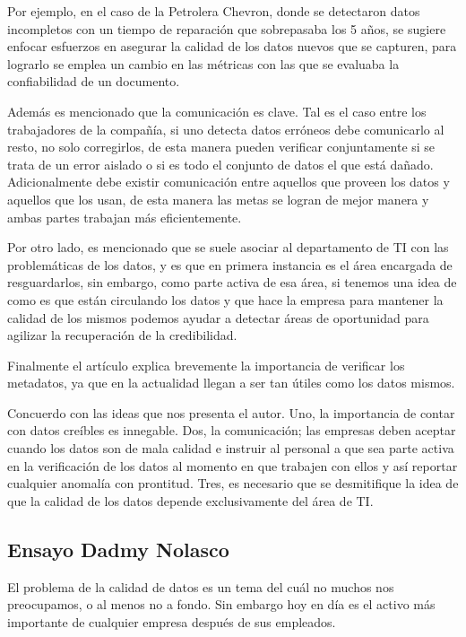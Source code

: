 \documentclass{exam}
\begin{document}
Por ejemplo, en el caso de la Petrolera Chevron, donde se detectaron datos incompletos con un tiempo de reparación que sobrepasaba los 5 años, se sugiere enfocar esfuerzos en asegurar la calidad de los datos nuevos que se capturen, para lograrlo se emplea un cambio en las métricas con las que se evaluaba la confiabilidad de un documento. 

Además es mencionado que la comunicación es clave. Tal es el caso entre los trabajadores de la compañía, si uno detecta datos erróneos debe comunicarlo al resto, no solo corregirlos, de esta manera pueden verificar conjuntamente si se trata de un error aislado o si es todo el conjunto de datos el que está dañado. Adicionalmente debe existir comunicación entre aquellos que proveen los datos y aquellos que los usan, de esta manera las metas se logran de mejor manera y ambas partes trabajan más eficientemente.

Por otro lado, es mencionado que se suele asociar al departamento de TI con las problemáticas de los datos, y es que en primera instancia es el área encargada de resguardarlos, sin embargo, como parte activa de esa área, si tenemos una idea de como es que están circulando los datos y que hace la empresa para mantener la calidad de los mismos podemos ayudar a detectar áreas de oportunidad para agilizar la recuperación de la credibilidad.

Finalmente el artículo explica brevemente la importancia de verificar los metadatos, ya que en la actualidad llegan a ser tan útiles como los datos mismos.

Concuerdo con las ideas que nos presenta el autor. Uno, la importancia de contar con datos creíbles es innegable. Dos, la comunicación; las empresas deben aceptar cuando los datos son de mala calidad e instruir al personal a que sea parte activa en la verificación de los datos al momento en que trabajen con ellos y así reportar cualquier anomalía con prontitud. Tres, es necesario que se desmitifique la idea de que la calidad de los datos depende exclusivamente del área de TI. 

\pagebreak

\subsection*{Ensayo Dadmy Nolasco}
El problema de la calidad de datos es un tema del cuál no muchos nos preocupamos, o al menos no a fondo. Sin embargo hoy en día es el activo más importante de cualquier empresa después de sus empleados.
\end{document}
